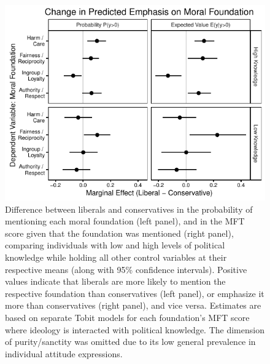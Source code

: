 \documentclass[12pt]{article}
\begin{document}
\begin{figure}[ht]\centering
\includegraphics{../calc/fig/tobit_ideol_know.pdf}
\caption{Difference between liberals and conservatives in the probability of mentioning each moral foundation (left panel), and in the MFT score given that the foundation was mentioned (right panel), comparing individuals with low and high levels of political knowledge while holding all other control variables at their respective means (along with 95\% confidence intervals). Positive values indicate that liberals are more likely to mention the respective foundation than conservatives (left panel), or emphasize it more than conservatives (right panel), and vice versa. Estimates are based on separate Tobit models for each foundation's MFT score where ideology is interacted with political knowledge. The dimension of purity/sanctity was omitted due to its low general prevalence in individual attitude expressions.}\label{fig:tobit_ideol_know}
\end{figure}
\end{document}
